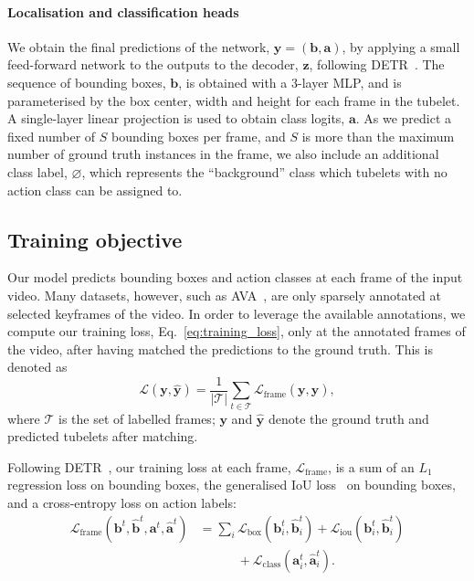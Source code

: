 \documentclass[10pt,twocolumn,letterpaper]{article}
\def \paravspace {-0.7\baselineskip}
\begin{document}
\vspace{\paravspace}
\paragraph{Localisation and classification heads}

We obtain the final predictions of the network, $\mathbf{y} = (\mathbf{b}, \mathbf{a})$, by applying a small feed-forward network to the outputs to the decoder, $\mathbf{z}$, following DETR~\cite{carion_eccv_2020}. The sequence of bounding boxes, $\mathbf{b}$, is obtained with a 3-layer MLP, and is parameterised by the box center, width and height for each frame in the tubelet.
A single-layer linear projection is used to obtain class logits, $\mathbf{a}$.
As we predict a fixed number of $S$  bounding boxes per frame, and $S$ is more than the maximum number
of ground truth instances in the frame, we also include an additional class label, $\varnothing$, which represents the ``background'' class 
 which tubelets with no action class can be assigned to.

\subsection{Training objective}
\label{sec:method_loss}

Our model predicts bounding boxes and action classes at each frame of the input video.
Many datasets, however, such as AVA~\cite{gu_cvpr_2018}, are only sparsely annotated at selected keyframes of the video.
In order to leverage the available annotations, we compute our training loss, Eq.~\ref{eq:training_loss}, only at the annotated frames of the video, after having matched the predictions to the ground truth.
This is denoted as \begin{equation}
	\mathcal{L}(\mathbf{y}, \hat{\mathbf{y}}) = \frac{1}{|\mathcal{T}|} \sum_{t \in \mathcal{T}} \mathcal{L}_{\text{frame}}(\mathbf{y}, \hat{\mathbf{y}}) \label{eq:training_loss},
\end{equation}
where $\mathcal{T}$ is the set of labelled frames; $\mathbf{y}$ and $\mathbf{\hat{y}}$ denote the ground truth and predicted tubelets after matching. 

Following DETR~\cite{carion_eccv_2020}, our training loss at each frame, $\mathcal{L}_{\text{frame}}$, is a sum of an $L_1$ regression loss on bounding boxes, the generalised IoU loss~\cite{rezatofighi2019generalized} on bounding boxes, and a cross-entropy loss on action labels:
\begin{align}
	\mathcal{L}_{\text{frame}}(\mathbf{b}^t, \hat{\mathbf{b}}^t, \mathbf{a}^t, \hat{\mathbf{a}}^t) &= \sum_{i} \mathcal{L}_{\text{box}}(\mathbf{b}^t_i, \hat{\mathbf{b}}^t_i) +  \mathcal{L}_{\text{iou}}(\mathbf{b}^t_i, \hat{\mathbf{b}}^t_i) \nonumber \\
	& \quad \qquad + \mathcal{L}_{\text{class}}(\mathbf{a}^t_i, \hat{\mathbf{a}}^t_i).
	\label{eq:frame_loss}
\end{align}
\end{document}
